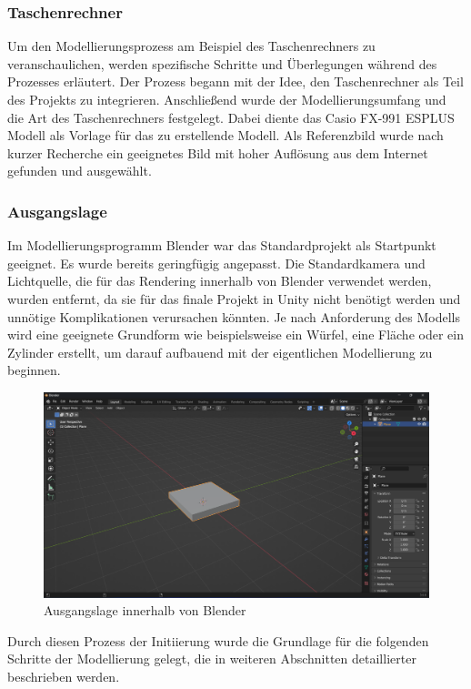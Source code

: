 \subsubsection{Taschenrechner}  \label{sec:taschenrechner}
Um den Modellierungsprozess am Beispiel des Taschenrechners zu veranschaulichen, werden spezifische Schritte und Überlegungen während des Prozesses erläutert. Der Prozess begann mit der Idee, den Taschenrechner als Teil des Projekts zu integrieren. Anschließend wurde der Modellierungsumfang und die Art des Taschenrechners festgelegt. Dabei diente das Casio FX-991 ESPLUS Modell als Vorlage für das zu erstellende Modell. Als Referenzbild wurde nach kurzer Recherche ein geeignetes Bild mit hoher Auflösung aus dem Internet gefunden und ausgewählt.

\subsubsection*{Ausgangslage}
Im Modellierungsprogramm Blender war das Standardprojekt als Startpunkt geeignet. Es wurde bereits geringfügig angepasst. Die Standardkamera und Lichtquelle, die für das Rendering innerhalb von Blender verwendet werden, wurden entfernt, da sie für das finale Projekt in Unity nicht benötigt werden und unnötige Komplikationen verursachen könnten. Je nach Anforderung des Modells wird eine geeignete Grundform wie beispielsweise ein Würfel, eine Fläche oder ein Zylinder erstellt, um darauf aufbauend mit der eigentlichen Modellierung zu beginnen.

\begin{figure}[H]
    \centering
    \includegraphics[width=1\textwidth]{images/AusgangslageTaschenrechner.png}
    \caption{Ausgangslage innerhalb von Blender}
    \label{fig:Ausgangslage}
\end{figure}

Durch diesen Prozess der Initiierung wurde die Grundlage für die folgenden Schritte der Modellierung gelegt, die in weiteren Abschnitten detaillierter beschrieben werden.

